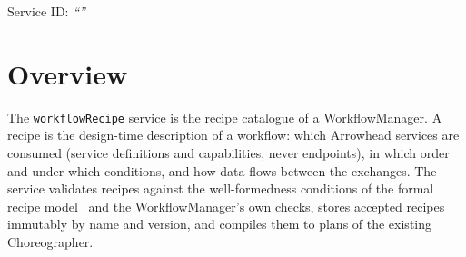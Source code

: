\documentclass[a4paper]{arrowhead}
\begin{document}
\ArrowheadSetup

\begin{center}
  \vspace*{1cm}
  \huge{\arrowtitle}

  \vspace*{0.2cm}
  \LARGE{\arrowtype}
  \vspace*{1cm}

  \Large{Service ID: \textit{``\arrowid''}}
  \vspace*{\fill}

  

  \vspace*{1cm}
  \vspace*{\fill}

  \begin{abstract}
    This document describes the \texttt{workflow\allowbreak{}Recipe} service of the Eclipse Arrowhead workflow support systems, which validates, registers, lists, retires and compiles workflow recipes. It is provided by the WorkflowManager system, service version 1.0.0, documentation edition 5.4.0.
  \end{abstract}

  \vspace*{1cm}
\end{center}

\newpage

\tableofcontents
\newpage

\section{Overview}
\label{sec:overview}
The \texttt{workflow\allowbreak{}Recipe} service is the recipe catalogue of a WorkflowManager. A recipe is the
design-time description of a workflow: which Arrowhead services are consumed (service definitions and capabilities,
never endpoints), in which order and under which conditions, and how data flows between the exchanges. The service
validates recipes against the well-formedness conditions of the formal recipe model~\cite{varga2026} and the
WorkflowManager's own checks, stores accepted recipes immutably by name and version, and compiles them to plans of the
existing Choreographer.
\end{document}
